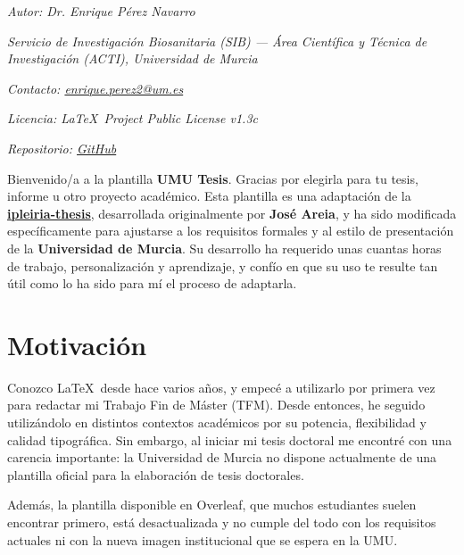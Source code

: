 
{
\parindent0pt

\textit{Autor: Dr. Enrique Pérez Navarro}

\textit{Servicio de Investigación Biosanitaria (SIB) --- Área Científica y Técnica de Investigación (ACTI), Universidad de Murcia}

\textit{Contacto: \href{mailto:enrique.perez2@um.es}{enrique.perez2@um.es}}

\textit{Licencia: \LaTeX~Project Public License v1.3c}

\textit{Repositorio: \href{https://github.com/enriiquee/umu-thesis}{GitHub}}

Bienvenido/a a la plantilla \textcolor{maincolor}{\textbf{UMU Tesis}}. Gracias por elegirla para tu tesis, informe u otro proyecto académico. Esta plantilla es una adaptación de la \textbf{\href{https://github.com/joseareia/ipleiria-thesis}{ipleiria-thesis}}, desarrollada originalmente por \textbf{José Areia}, y ha sido modificada específicamente para ajustarse a los requisitos formales y al estilo de presentación de la \textbf{Universidad de Murcia}. Su desarrollo ha requerido unas cuantas horas de trabajo, personalización y aprendizaje, y confío en que su uso te resulte tan útil como lo ha sido para mí el proceso de adaptarla.

\section{Motivación}
Conozco \LaTeX~desde hace varios años, y empecé a utilizarlo por primera vez para redactar mi Trabajo Fin de Máster (TFM). Desde entonces, he seguido utilizándolo en distintos contextos académicos por su potencia, flexibilidad y calidad tipográfica. Sin embargo, al iniciar mi tesis doctoral me encontré con una carencia importante: la Universidad de Murcia no dispone actualmente de una plantilla oficial para la elaboración de tesis doctorales.

Además, la plantilla disponible en Overleaf, que muchos estudiantes suelen encontrar primero, está desactualizada y no cumple del todo con los requisitos actuales ni con la nueva imagen institucional que se espera en la UMU. 

}
